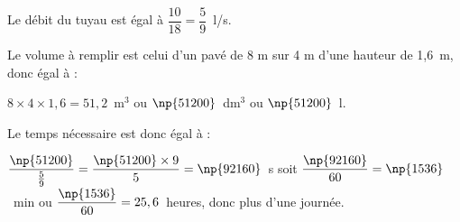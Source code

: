 \documentclass[10pt]{article}
\begin{document}
\setlength\parindent{0mm}
\pagestyle{fancy}
\thispagestyle{empty}
    
    
    




\medskip

%
%
%
Le débit du tuyau est égal à $\dfrac{10}{18} = \dfrac{5}{9}$~l/s.

Le volume à remplir est celui d'un pavé de 8 m sur 4 m d'une hauteur de 1,6~m, donc égal à :

$8 \times 4 \times 1,6 = 51,2$~m$^3$ ou $\np{51200}$~dm$^3$ ou $\np{51200}$~l.

Le temps nécessaire est donc égal à :

$\dfrac{\np{51200}}{\frac{5}{9}} = \dfrac{\np{51200} \times 9}{5} = \np{92160}$~s soit $\dfrac{\np{92160}}{60} = \np{1536}$~min ou $\dfrac{\np{1536}}{60} = 25,6$~heures, donc plus d'une journée.
\bigskip
\end{document}
